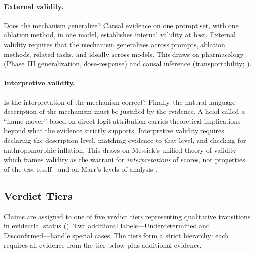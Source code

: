 \documentclass[10pt]{article}
\begin{document}
\paragraph{External validity.} Does the mechanism generalize? Causal evidence on one prompt set, with one ablation method, in one model, establishes internal validity at best. External validity requires that the mechanism generalizes across prompts, ablation methods, related tasks, and ideally across models. This draws on pharmacology (Phase~III generalization, dose-response) and causal inference (transportability; \citealp{pearl2011transportability}).

\paragraph{Interpretive validity.} Is the interpretation of the mechanism correct? Finally, the natural-language description of the mechanism must be justified by the evidence. A head called a ``name mover'' based on direct logit attribution carries theoretical implications beyond what the evidence strictly supports. Interpretive validity requires declaring the description level, matching evidence to that level, and checking for anthropomorphic inflation. This draws on Messick's unified theory of validity \citep{messick1995validity}---which frames validity as the warrant for \emph{interpretations} of scores, not properties of the test itself---and on Marr's levels of analysis \citep{marr1982vision}.

\subsection{Verdict Tiers}
\label{sec:verdict-tiers}

Claims are assigned to one of five verdict tiers representing qualitative transitions in evidential status (). Two additional labels---Underdetermined and Disconfirmed---handle special cases. The tiers form a strict hierarchy: each requires all evidence from the tier below plus additional evidence.
\end{document}
